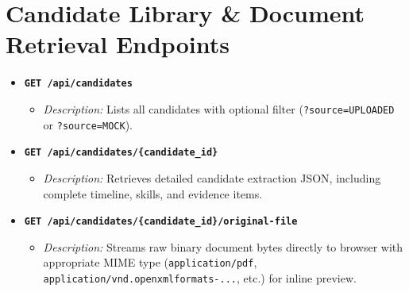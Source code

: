 \documentclass[11pt,a4paper]{report}
\begin{document}
\section{Candidate Library \& Document Retrieval Endpoints}
\begin{itemize}[leftmargin=1.5em]
    \item \textbf{\texttt{GET /api/candidates}}
    \begin{itemize}
        \item \emph{Description:} Lists all candidates with optional filter (\texttt{?source=UPLOADED} or \texttt{?source=MOCK}).
    \end{itemize}
    \item \textbf{\texttt{GET /api/candidates/\{candidate\_id\}}}
    \begin{itemize}
        \item \emph{Description:} Retrieves detailed candidate extraction JSON, including complete timeline, skills, and evidence items.
    \end{itemize}
    \item \textbf{\texttt{GET /api/candidates/\{candidate\_id\}/original-file}}
    \begin{itemize}
        \item \emph{Description:} Streams raw binary document bytes directly to browser with appropriate MIME type (\texttt{application/pdf}, \texttt{application/vnd.openxmlformats-...}, etc.) for inline preview.
    \end{itemize}
\end{itemize}
\end{document}
